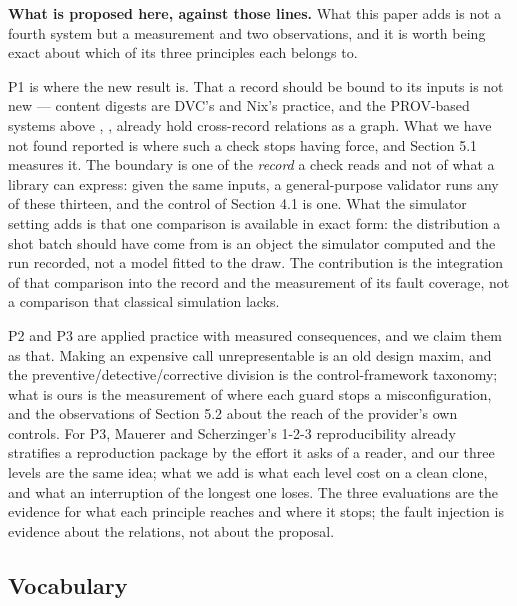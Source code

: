 \documentclass[acmsmall,screen,review]{acmart}
\begin{document}
\textbf{What is proposed here, against those lines.} What this paper adds is not a fourth system but a measurement and two observations, and it is worth being exact about which of its three principles each belongs to.


P1 is where the new result is. That a record should be bound to its inputs is not new --- content digests are DVC's \cite{ref25} and Nix's practice, and the PROV-based systems above \cite{ref2}, \cite{ref12}, \cite{ref13} already hold cross-record relations as a graph. What we have not found reported is where such a check stops having force, and Section 5.1 measures it. The boundary is one of the \textit{record} a check reads and not of what a library can express: given the same inputs, a general-purpose validator runs any of these thirteen, and the control of Section 4.1 is one. What the simulator setting adds is that one comparison is available in exact form: the distribution a shot batch should have come from is an object the simulator computed and the run recorded, not a model fitted to the draw. The contribution is the integration of that comparison into the record and the measurement of its fault coverage, not a comparison that classical simulation lacks.


P2 and P3 are applied practice with measured consequences, and we claim them as that. Making an expensive call unrepresentable is an old design maxim, and the preventive/detective/corrective division is the control-framework taxonomy; what is ours is the measurement of where each guard stops a misconfiguration, and the observations of Section 5.2 about the reach of the provider's own controls. For P3, Mauerer and Scherzinger's 1-2-3 reproducibility \cite{ref27} already stratifies a reproduction package by the effort it asks of a reader, and our three levels are the same idea; what we add is what each level cost on a clean clone, and what an interruption of the longest one loses. The three evaluations are the evidence for what each principle reaches and where it stops; the fault injection is evidence about the relations, not about the proposal.

\subsection{Vocabulary}
\end{document}
